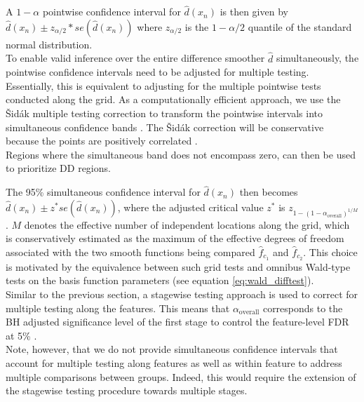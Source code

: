 A $1-\alpha$ pointwise confidence interval for $\hat{d}(x_n)$ is then given by $\hat{d}(x_n) \pm  z_{\alpha/2}*se(\hat{d}(x_n))$ where $z_{\alpha/2}$ is the $1-\alpha/2$ quantile of the standard normal distribution.\\ 
To enable valid inference over the entire difference smoother $\hat{d}$ simultaneously, the pointwise confidence intervals need to be adjusted for multiple testing. Essentially, this is equivalent to adjusting for the multiple pointwise tests conducted along the grid. As a computationally efficient approach, we use the Šidák multiple testing correction to transform the pointwise intervals into simultaneous confidence bands \cite{sidak}. The Šidák correction will be conservative because the points are positively correlated \cite{simes}.\\
Regions where the simultaneous band does not encompass zero, can then be used to prioritize DD regions.

The 95\% simultaneous confidence interval for $\hat{d}(x_n)$ then becomes $\hat{d}(x_n) \pm  z^*se(\hat{d}(x_n))$, where the adjusted critical value $z^*$ is $z_{1-{(1-\alpha_{\text{overall}})}^{1/M}}$. 
$M$ denotes the effective number of independent locations along the grid, which is conservatively estimated as the maximum of the effective degrees of freedom associated with the two smooth functions being compared $\hat{f}_{c_1}$ and $\hat{f}_{c_2}$. This choice is motivated by the equivalence between such grid tests and omnibus Wald-type tests on the basis function parameters (see equation \ref{eq:wald_difftest}).\\

Similar to the previous section, a stagewise testing approach is used to correct for multiple testing along the features. This means that $\alpha_{\text{overall}}$ corresponds to the BH adjusted significance level of the first stage to control the feature-level FDR at 5\% \cite{stagewise_testing}.\\ 
Note, however, that we do not provide simultaneous confidence intervals that account for multiple testing along features as well as within feature to address multiple comparisons between groups. Indeed, this would require the extension of the stagewise testing procedure towards multiple stages.
